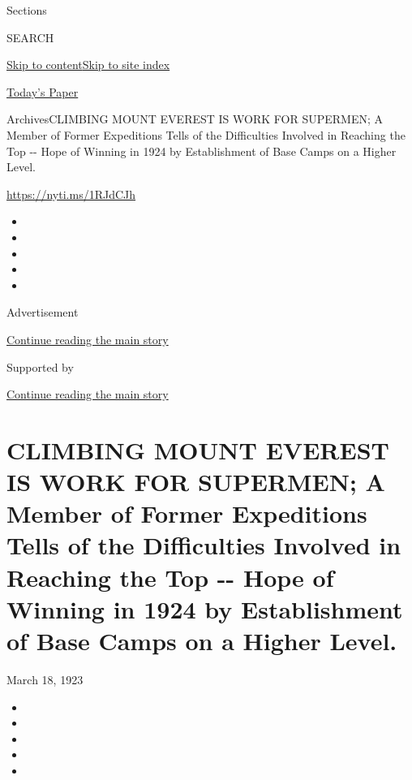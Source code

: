 Sections

SEARCH

\protect\hyperlink{site-content}{Skip to
content}\protect\hyperlink{site-index}{Skip to site index}

\href{https://myaccount.nytimes.com/auth/login?response_type=cookie\&client_id=vi}{}

\href{https://www.nytimes.com/section/todayspaper}{Today's Paper}

Archives\textbar{}CLIMBING MOUNT EVEREST IS WORK FOR SUPERMEN; A Member
of Former Expeditions Tells of the Difficulties Involved in Reaching the
Top -\/- Hope of Winning in 1924 by Establishment of Base Camps on a
Higher Level.

\url{https://nyti.ms/1RJdCJh}

\begin{itemize}
\item
\item
\item
\item
\item
\end{itemize}

Advertisement

\protect\hyperlink{after-top}{Continue reading the main story}

Supported by

\protect\hyperlink{after-sponsor}{Continue reading the main story}

\hypertarget{climbing-mount-everest-is-work-for-supermen-a-member-of-former-expeditions-tells-of-the-difficulties-involved-in-reaching-the-top----hope-of-winning-in-1924-by-establishment-of-base-camps-on-a-higher-level}{%
\section{CLIMBING MOUNT EVEREST IS WORK FOR SUPERMEN; A Member of Former
Expeditions Tells of the Difficulties Involved in Reaching the Top -\/-
Hope of Winning in 1924 by Establishment of Base Camps on a Higher
Level.}\label{climbing-mount-everest-is-work-for-supermen-a-member-of-former-expeditions-tells-of-the-difficulties-involved-in-reaching-the-top----hope-of-winning-in-1924-by-establishment-of-base-camps-on-a-higher-level}}

March 18, 1923

\begin{itemize}
\item
\item
\item
\item
\item
\end{itemize}

